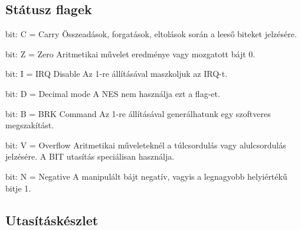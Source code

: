 \subsection{Státusz flagek}

\begin{compactenum}
	\setcounter{enumi}{-1}
	\item bit: C = Carry \newline Összeadások, forgatások, eltolások során a leeső biteket jelzésére.
	\item bit: Z = Zero   \newline Aritmetikai művelet eredménye vagy mozgatott bájt 0.
	\item bit: I = IRQ Disable
	\newline Az 1-re állításával maszkoljuk az IRQ-t.
	\item bit: D = Decimal mode
	\newline
	A NES nem használja ezt a flag-et.
	\item bit: B = BRK Command
	\newline Az 1-re állításával generálhatunk egy szoftveres megszakítást. 
	\setcounter{enumi}{5}
	\item bit: V = Overflow
	\newline 
	Aritmetikai műveleteknél a túlcsordulás vagy alulcsordulás jelzésére.
	A BIT utasítás speciálisan használja.
	\item bit: N = Negative
	\newline A manipulált bájt negatív, vagyis a legnagyobb helyiértékű bitje 1.
\end{compactenum}

\subsection{Utasításkészlet}
\label{instructionset}

